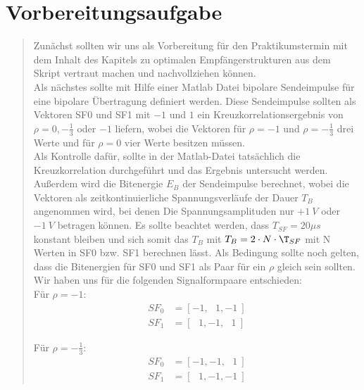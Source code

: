 \section{Vorbereitungsaufgabe}
\begin{quote}

    
    Zunächst sollten wir uns als Vorbereitung für den Praktikumstermin mit dem
    Inhalt des Kapitels zu optimalen Empfängerstrukturen aus dem Skript vertraut
    machen und nachvollziehen können.\\
    
    Als nächstes sollte mit Hilfe einer Matlab Datei bipolare Sendeimpulse
    für eine bipolare Übertragung definiert werden. Diese Sendeimpulse sollten als
    Vektoren SF0 und SF1 mit $-1$ und $1$ ein Kreuzkorrelationsergebnis von $\rho
    = 0, -\frac{1}{3}$ oder $-1$ liefern, wobei die Vektoren für $\rho = -1$ und
    $\rho = -\frac{1}{3}$ drei Werte und für $\rho = 0$ vier Werte besitzen
    müssen.\\
    Als Kontrolle dafür, sollte in der Matlab-Datei tatsächlich die
    Kreuzkorrelation durchgeführt und das Ergebnis untersucht werden. Außerdem wird
    die Bitenergie $E_B$ der Sendeimpulse berechnet, wobei die Vektoren als
    zeitkontinuierliche Spannungsverläufe der Dauer $T_B$ angenommen wird, bei
    denen Die Spannungsamplituden nur $+1\ V$ oder $-1\ V$ betragen können.
    Es sollte beachtet werden, dass $T_{SF} = 20\mu s$ konstant bleiben und sich
    somit das $T_B$ mit $T_B = 2 \cdot N \cdot \T_{SF}$ mit N Werten in SF0 bzw.
    SF1 berechnen lässt. Als Bedingung sollte noch gelten, dass die Bitenergien für
    SF0 und SF1 als Paar für ein $\rho$ gleich sein sollten.\\
    
    Wir haben uns für die folgenden Signalformpaare entschieden:\\ 
	
	Für $\rho = -1$: 
	\begin{equation*}
    	\begin{split}
    		SF_0 &= [-1, \ \ \ 1, -1 \ ]\\
    		SF_1 &= [ \ \ \ 1, -1, \ \ \ 1 \ ]
    	\end{split}
    \end{equation*}
    
    Für $\rho = -\frac{1}{3}$: 
    \begin{equation*}
        \begin{split}
            SF_0 &= [-1, -1, \ \ \ 1 \ ]\\
            SF_1 &= [ \ \ \ 1, -1, -1 \ ]
        \end{split}
    \end{equation*}
    

\end{quote}
